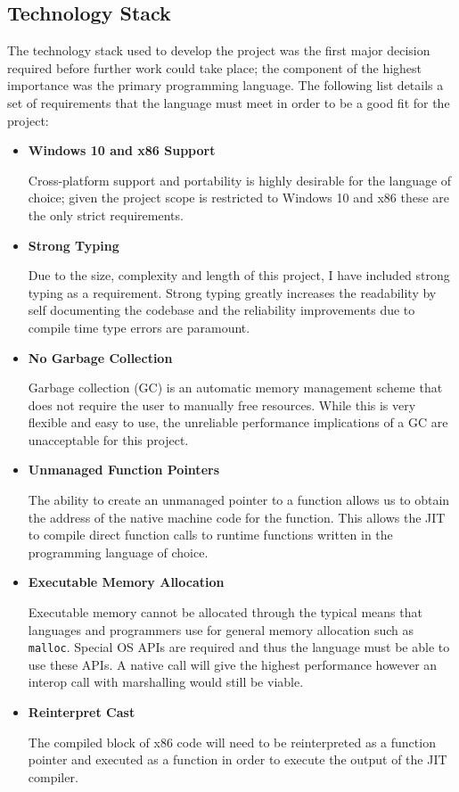 \subsection{Technology Stack}

The technology stack used to develop the project was the first major decision required before further work could take place; the component of the highest importance was the primary programming language. The following list details a set of requirements that the language must meet in order to be a good fit for the project:

\begin{itemize}
    \item \textbf{Windows 10 and x86 Support}
    
    Cross-platform support and portability is highly desirable for the language of choice; given the project scope is restricted to Windows 10 and x86 these are the only strict requirements.

    \item \textbf{Strong Typing}
    
    Due to the size, complexity and length of this project, I have included strong typing as a requirement. Strong typing greatly increases the readability by self documenting the codebase and the reliability improvements due to compile time type errors are paramount.

    \item \textbf{No Garbage Collection}
    
    Garbage collection (GC) is an automatic memory management scheme that does not require the user to manually free resources. While this is very flexible and easy to use, the unreliable performance implications of a GC are unacceptable for this project.

    \item \textbf{Unmanaged Function Pointers}
    
    The ability to create an unmanaged pointer to a function allows us to obtain the address of the native machine code for the function. This allows the JIT to compile direct function calls to runtime functions written in the programming language of choice.

    \item \textbf{Executable Memory Allocation}
    
    Executable memory cannot be allocated through the typical means that languages and programmers use for general memory allocation such as \texttt{malloc}. Special OS APIs are required and thus the language must be able to use these APIs. A native call will give the highest performance however an interop call with marshalling would still be viable.

    \item \textbf{Reinterpret Cast}
    
    The compiled block of x86 code will need to be reinterpreted as a function pointer and executed as a function in order to execute the output of the JIT compiler.
\end{itemize}


